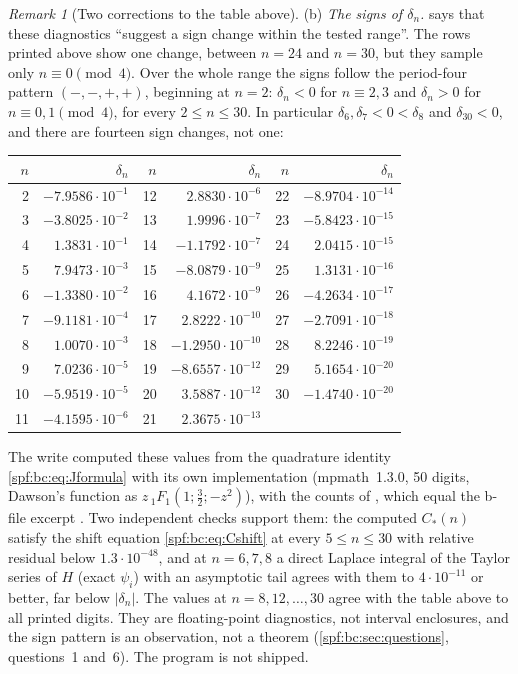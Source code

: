 \documentclass[11pt]{article}
\numberwithin{equation}{section}
\theoremstyle{definition}
\theoremstyle{remark}
\newtheorem{remark}[theorem]{Remark}
\theoremstyle{definition}
\newcommand{\bcC}{C_{\!*}}
\begin{document}
\begin{remark}[Two corrections to the table above]
(b) \emph{The signs of $\delta_n$.}  says that these
diagnostics ``suggest a sign change within the tested range''. The rows
printed above show one change, between $n=24$ and $n=30$, but they sample only
$n\equiv0\pmod4$. Over the whole range the signs follow the period-four
pattern $(-,-,+,+)$, beginning at $n=2$: $\delta_n<0$ for $n\equiv2,3$ and
$\delta_n>0$ for $n\equiv0,1\pmod4$, for every $2\le n\le30$. In particular
$\delta_6,\delta_7<0<\delta_8$ and $\delta_{30}<0$, and there are fourteen
sign changes, not one:
\begin{center}\small
\renewcommand{\arraystretch}{1.1}
\begin{tabular}{@{}rr@{\qquad}rr@{\qquad}rr@{}}
\toprule
$n$ & $\delta_n$ & $n$ & $\delta_n$ & $n$ & $\delta_n$\\
\midrule
2 & $-7.9586\cdot10^{-1}$ & 12 & $2.8830\cdot10^{-6}$ & 22 & $-8.9704\cdot10^{-14}$\\
3 & $-3.8025\cdot10^{-2}$ & 13 & $1.9996\cdot10^{-7}$ & 23 & $-5.8423\cdot10^{-15}$\\
4 & $1.3831\cdot10^{-1}$ & 14 & $-1.1792\cdot10^{-7}$ & 24 & $2.0415\cdot10^{-15}$\\
5 & $7.9473\cdot10^{-3}$ & 15 & $-8.0879\cdot10^{-9}$ & 25 & $1.3131\cdot10^{-16}$\\
6 & $-1.3380\cdot10^{-2}$ & 16 & $4.1672\cdot10^{-9}$ & 26 & $-4.2634\cdot10^{-17}$\\
7 & $-9.1181\cdot10^{-4}$ & 17 & $2.8222\cdot10^{-10}$ & 27 & $-2.7091\cdot10^{-18}$\\
8 & $1.0070\cdot10^{-3}$ & 18 & $-1.2950\cdot10^{-10}$ & 28 & $8.2246\cdot10^{-19}$\\
9 & $7.0236\cdot10^{-5}$ & 19 & $-8.6557\cdot10^{-12}$ & 29 & $5.1654\cdot10^{-20}$\\
10 & $-5.9519\cdot10^{-5}$ & 20 & $3.5887\cdot10^{-12}$ & 30 & $-1.4740\cdot10^{-20}$\\
11 & $-4.1595\cdot10^{-6}$ & 21 & $2.3675\cdot10^{-13}$ &  & \\
\bottomrule
\end{tabular}
\end{center}
The write computed these values from the quadrature identity
\eqref{spf:bc:eq:Jformula} with its own implementation (mpmath~1.3.0, 50
digits, Dawson's function as $z\,{}_1F_1(1;\frac32;-z^2)$), with the counts of
, which equal the b-file
excerpt . Two independent
checks support them: the computed $\bcC(n)$ satisfy the shift equation
\eqref{spf:bc:eq:Cshift} at every $5\le n\le30$ with relative residual below
$1.3\cdot10^{-48}$, and at $n=6,7,8$ a direct Laplace integral of the Taylor
series of $H$ (exact $\psi_i$) with an asymptotic tail agrees with them to
$4\cdot10^{-11}$ or better, far below $|\delta_n|$. The values at $n=8,12,\ldots,30$
agree with the table above to all printed digits. They are floating-point
diagnostics, not interval enclosures, and the sign pattern is an observation,
not a theorem (\cref{spf:bc:sec:questions}, questions~1 and~6). The program is
not shipped.
\end{remark}
\end{document}
